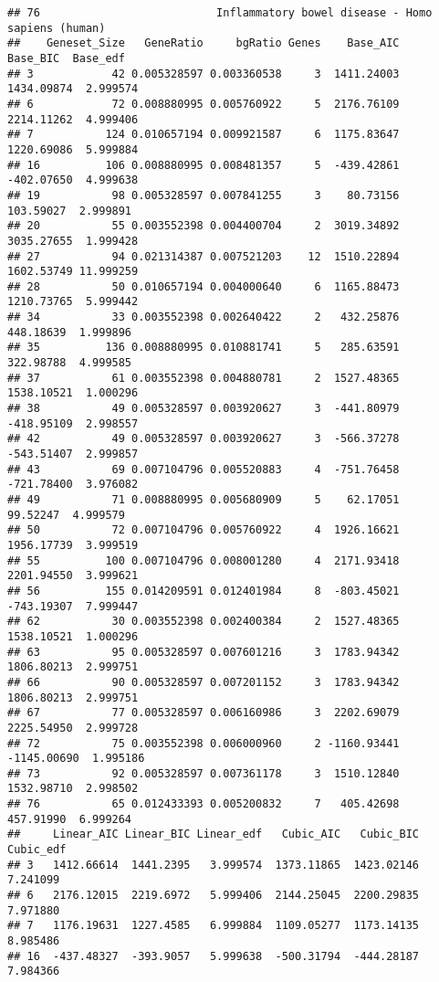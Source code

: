 \documentclass[
]{article}
\begin{document}
\begin{verbatim}
## 76                           Inflammatory bowel disease - Homo sapiens (human)
##    Geneset_Size   GeneRatio     bgRatio Genes    Base_AIC    Base_BIC  Base_edf
## 3            42 0.005328597 0.003360538     3  1411.24003  1434.09874  2.999574
## 6            72 0.008880995 0.005760922     5  2176.76109  2214.11262  4.999406
## 7           124 0.010657194 0.009921587     6  1175.83647  1220.69086  5.999884
## 16          106 0.008880995 0.008481357     5  -439.42861  -402.07650  4.999638
## 19           98 0.005328597 0.007841255     3    80.73156   103.59027  2.999891
## 20           55 0.003552398 0.004400704     2  3019.34892  3035.27655  1.999428
## 27           94 0.021314387 0.007521203    12  1510.22894  1602.53749 11.999259
## 28           50 0.010657194 0.004000640     6  1165.88473  1210.73765  5.999442
## 34           33 0.003552398 0.002640422     2   432.25876   448.18639  1.999896
## 35          136 0.008880995 0.010881741     5   285.63591   322.98788  4.999585
## 37           61 0.003552398 0.004880781     2  1527.48365  1538.10521  1.000296
## 38           49 0.005328597 0.003920627     3  -441.80979  -418.95109  2.998557
## 42           49 0.005328597 0.003920627     3  -566.37278  -543.51407  2.999857
## 43           69 0.007104796 0.005520883     4  -751.76458  -721.78400  3.976082
## 49           71 0.008880995 0.005680909     5    62.17051    99.52247  4.999579
## 50           72 0.007104796 0.005760922     4  1926.16621  1956.17739  3.999519
## 55          100 0.007104796 0.008001280     4  2171.93418  2201.94550  3.999621
## 56          155 0.014209591 0.012401984     8  -803.45021  -743.19307  7.999447
## 62           30 0.003552398 0.002400384     2  1527.48365  1538.10521  1.000296
## 63           95 0.005328597 0.007601216     3  1783.94342  1806.80213  2.999751
## 66           90 0.005328597 0.007201152     3  1783.94342  1806.80213  2.999751
## 67           77 0.005328597 0.006160986     3  2202.69079  2225.54950  2.999728
## 72           75 0.003552398 0.006000960     2 -1160.93441 -1145.00690  1.995186
## 73           92 0.005328597 0.007361178     3  1510.12840  1532.98710  2.998502
## 76           65 0.012433393 0.005200832     7   405.42698   457.91990  6.999264
##     Linear_AIC Linear_BIC Linear_edf   Cubic_AIC   Cubic_BIC Cubic_edf
## 3   1412.66614  1441.2395   3.999574  1373.11865  1423.02146  7.241099
## 6   2176.12015  2219.6972   5.999406  2144.25045  2200.29835  7.971880
## 7   1176.19631  1227.4585   6.999884  1109.05277  1173.14135  8.985486
## 16  -437.48327  -393.9057   5.999638  -500.31794  -444.28187  7.984366

\end{verbatim}
\end{document}
